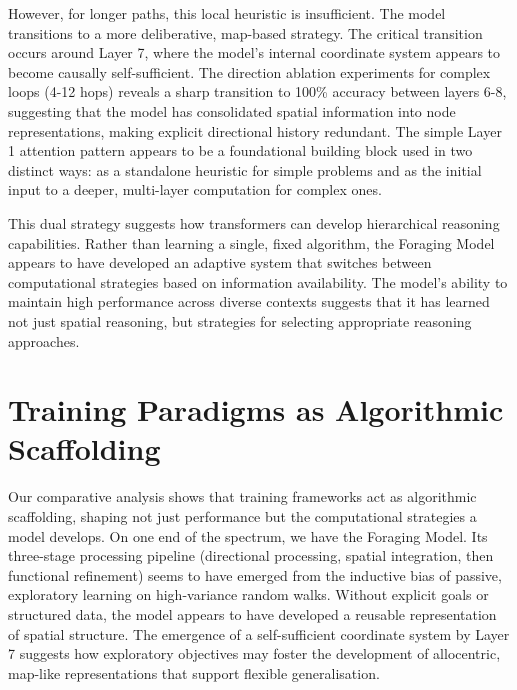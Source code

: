 However, for longer paths, this local heuristic is insufficient. The model transitions to a more deliberative, map-based strategy. The critical transition occurs around Layer 7, where the model's internal coordinate system appears to become causally self-sufficient. The direction ablation experiments for complex loops (4-12 hops) reveals a sharp transition to 100\% accuracy between layers 6-8, suggesting that the model has consolidated spatial information into node representations, making explicit directional history redundant. The simple Layer 1 attention pattern appears to be a foundational building block used in two distinct ways: as a standalone heuristic for simple problems and as the initial input to a deeper, multi-layer computation for complex ones. 

This dual strategy suggests how transformers can develop hierarchical reasoning capabilities. Rather than learning a single, fixed algorithm, the Foraging Model appears to have developed an adaptive system that switches between computational strategies based on information availability. The model's ability to maintain high performance across diverse contexts suggests that it has learned not just spatial reasoning, but strategies for selecting appropriate reasoning approaches.

\section{Training Paradigms as Algorithmic Scaffolding}

Our comparative analysis shows that training frameworks act as algorithmic scaffolding, shaping not just performance but the computational strategies a model develops. On one end of the spectrum, we have the Foraging Model. Its three-stage processing pipeline (directional processing, spatial integration, then functional refinement) seems to have emerged from the inductive bias of passive, exploratory learning on high-variance random walks. Without explicit goals or structured data, the model appears to have developed a reusable representation of spatial structure. The emergence of a self-sufficient coordinate system by Layer 7 suggests how exploratory objectives may foster the development of allocentric, map-like representations that support flexible generalisation. 

